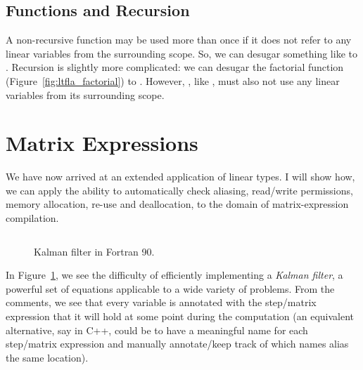 \subsection{Functions and Recursion}

A non-recursive function may be used more than once if it does not refer to any
linear variables from the surrounding scope. So, we can desugar something like
 to . Recursion is
slightly more complicated: we can desugar the factorial function
(Figure~\ref{fig:ltfla_factorial}) to . However, , like ,
must also not use any linear variables from its surrounding scope.

\section{Matrix Expressions}

We have now arrived at an extended application of linear types. I will show
how, we can apply the ability to automatically check aliasing, read/write
permissions, memory allocation, re-use and deallocation, to the domain of
matrix-expression compilation.

\begin{figure}
    \inputminted[linenos, fontsize=\footnotesize]{fortran}{kalman.f90}
    \caption{Kalman filter in Fortran 90.}\label{fig:fortran_kalman}
\end{figure}

In Figure~\ref{fig:fortran_kalman}, we see the difficulty of efficiently
implementing a \emph{Kalman filter}, a powerful set of equations applicable
to a wide variety of problems. From the comments, we see that every variable is
annotated with the step/matrix expression that it will hold at some point
during the computation (an equivalent alternative, say in C++, could be to have
a meaningful name for each step/matrix expression and manually annotate/keep
track of which names alias the same location).

